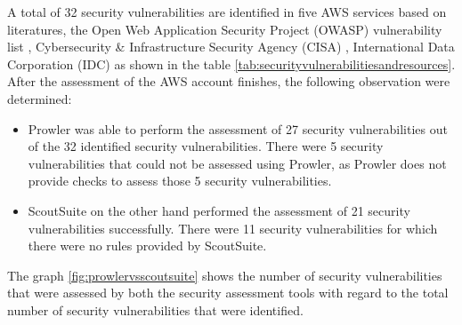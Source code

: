 \par A total of 32 security vulnerabilities are identified in five AWS services based on literatures, the Open Web Application Security Project (OWASP) vulnerability list \cite{51}, Cybersecurity \& Infrastructure Security Agency (CISA) \cite{52}, International Data Corporation (IDC) \cite{53} as shown in the table \ref{tab:securityvulnerabilitiesandresources}.
After the assessment of the AWS account finishes, the following observation were determined:
\begin{itemize}
    \item Prowler was able to perform the assessment of 27 security vulnerabilities out of the 32 identified security vulnerabilities.
    There were 5 security vulnerabilities that could not be assessed using Prowler, as Prowler does not provide checks to assess those 5 security vulnerabilities.
\end{itemize}
\begin{itemize}
    \item ScoutSuite on the other hand performed the assessment of 21 security vulnerabilities successfully.
    There were 11 security vulnerabilities for which
    there were no rules provided by ScoutSuite.
\end{itemize}

\par The graph \ref{fig:prowlervsscoutsuite} shows the number of security vulnerabilities that were assessed by both the security assessment tools with regard to the total number of security vulnerabilities that were identified.

